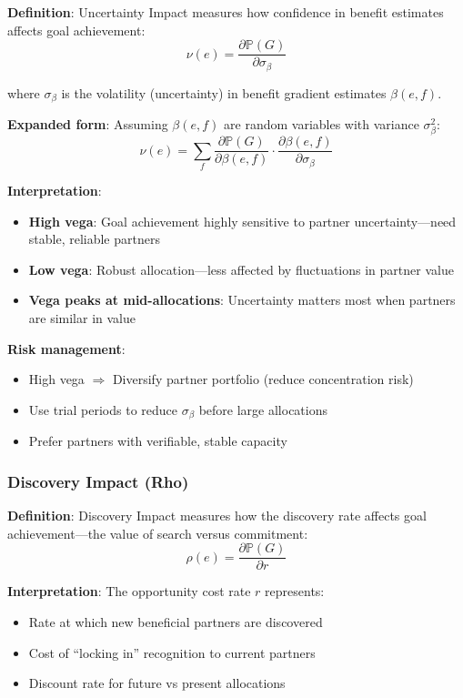 \textbf{Definition}: Uncertainty Impact measures how confidence in benefit estimates affects goal achievement:
\[ \nu(e) = \frac{\partial \mathbb{P}(G)}{\partial \sigma_\beta} \]

where $\sigma_\beta$ is the volatility (uncertainty) in benefit gradient estimates $\beta(e,f)$.

\textbf{Expanded form}: Assuming $\beta(e,f)$ are random variables with variance $\sigma_\beta^2$:
\[ \nu(e) = \sum_f \frac{\partial \mathbb{P}(G)}{\partial \beta(e,f)} \cdot \frac{\partial \beta(e,f)}{\partial \sigma_\beta} \]

\textbf{Interpretation}:
\begin{itemize}
\item \textbf{High vega}: Goal achievement highly sensitive to partner uncertainty---need stable, reliable partners
\item \textbf{Low vega}: Robust allocation---less affected by fluctuations in partner value
\item \textbf{Vega peaks at mid-allocations}: Uncertainty matters most when partners are similar in value
\end{itemize}

\textbf{Risk management}:
\begin{itemize}
\item High vega $\Rightarrow$ Diversify partner portfolio (reduce concentration risk)
\item Use trial periods to reduce $\sigma_\beta$ before large allocations
\item Prefer partners with verifiable, stable capacity
\end{itemize}

\subsubsection{Discovery Impact (Rho)}

\textbf{Definition}: Discovery Impact measures how the discovery rate affects goal achievement---the value of search versus commitment:
\[ \rho(e) = \frac{\partial \mathbb{P}(G)}{\partial r} \]

\textbf{Interpretation}: The opportunity cost rate $r$ represents:
\begin{itemize}
\item Rate at which new beneficial partners are discovered
\item Cost of ``locking in'' recognition to current partners
\item Discount rate for future vs present allocations
\end{itemize}

